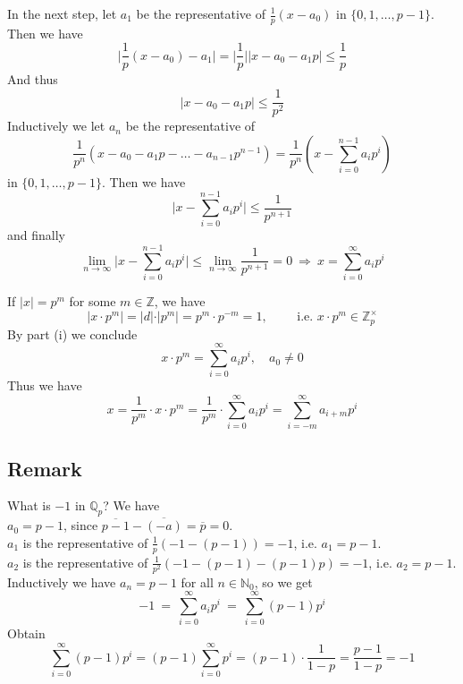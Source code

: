 \documentclass[12pt]{book}
\begin{document}
\begin{spacing}{1.3}
\begin{compactenum}
\begin{compactenum}
In the next step, let $a_1$ be the representative of $\frac{1}{p}(x-a_0)$ in $\{0,1, \ldots, p-1\}$. Then we have 
$$\bigg\vert \frac{1}{p} (x-a_0) - a_1 \bigg\vert = \bigg\vert \frac{1}{p} \bigg\vert \vert x-a_0-a_1p \vert \leqslant \frac{1}{p}$$
And thus
$$\vert x-a_0-a_1 p \vert \leqslant \frac{1}{p^2}$$
Inductively we let $a_n$ be the representative of $$\frac{1}{p^n}(x-a_0-a_1p- \ldots -a_{n-1}p^{n-1} )=\frac{1}{p^n} \left(x- \sum_{i=0}^{n-1} a_i p^{i} \right)$$
in $\{0,1, \ldots, p-1\}$. Then we have
$$\bigg\vert x- \sum_{i=0}^{n-1} a_i p^{i} \bigg\vert \leqslant \frac{1}{p^{n+1}}$$
and finally
$$\lim_{n \to \infty} \bigg\vert x- \sum_{i=0}^{n-1} a_i p^{i} \bigg\vert \leqslant \lim_{n \to \infty} \frac{1}{p^{n+1}} =0 \ \Longrightarrow \ x = \sum_{i=0}^{\infty} a_i p^{i}$$
\end{compactenum}
\item  If $|x|=p^m$ for some $m \in \mathbb{Z}$, we have $$\vert x \cdot p^m\vert = \vert d \vert \cdot \vert p^m \vert = p^m \cdot p^{-m}=1, \qquad \textrm{ i.e. }x \cdot p^m\in \mathbb{Z}_p^{\times}$$
By part (i) we conclude $$x \cdot p^m= \sum_{i=0}^{\infty} a_i p^{i}, \quad a_0 \neq 0$$
Thus we have
$$x= \frac{1}{p^m} \cdot x \cdot p^m = \frac{1}{p^m} \cdot \sum_{i=0}^{\infty} a_i p^{i} = \sum_{i=-m}^{\infty} a_{i+m}p^{i}$$
\end{compactenum}

\subsection{Remark}%
What is $-1$ in $\mathbb{Q}_p$? We have\\
$a_0=p-1$, since $\overline{p-1}-\overline{(-a)}=\overline{p}=0$.\\
$a_1$ is the representative of $\frac{1}{p}\left(-1-(p-1)\right)=-1$, i.e. $a_1=p-1$.\\
$a_2$ is the representative of $\frac{1}{p^2}\left(-1-(p-1)-(p-1)p\right)=-1$, i.e. $a_2=p-1$.\\
Inductively we have $a_n=p-1$ for all $n \in \mathbb{N}_0$, so we get
$$-1\ =\ \sum_{i=0}^{\infty} a_i p^{i}\ =\ \sum_{i=0}^{\infty} (p-1)p^{i}$$
Obtain
$$\sum_{i=0}^{\infty} (p-1)p^{i}=(p-1) \sum_{i=0}^{\infty} p^{i} = (p-1) \cdot \frac{1}{1-p} = \frac{p-1}{1-p}=-1$$


\end{spacing}
\end{document}
